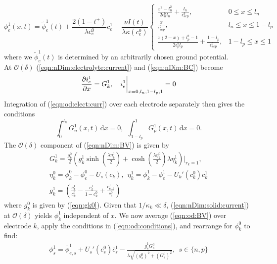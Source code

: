 \documentclass[preprint]{elsarticle}
\begin{document}
\begin{equation} 
	\phi_e^1(x,t) =\tilde{\phi}_e^1(t) + \frac{2(1-t^+)}{\lambda c_e^0}c_e^1 - \frac{\nu I(t)}{\lambda \kappa(c_e^0)}
    \begin{cases} 
    	   \frac{x^2-l_n^2}{2 \epsilon_n^b l_n} + \frac{l_n}{\epsilon_{sep}^b}, & 0\leq x \leq l_n \\
    	   \frac{x}{\epsilon_{sep}^b}, & l_n\leq x \leq 1-l_p \\
    	   \frac{x(2-x)+l_p^2-1}{2\epsilon_p^b l_p} + \frac{1-l_p}{\epsilon_{sep}^b}, & 1-l_p\leq x \leq 1
    \end{cases}  
\end{equation} 
where we $\tilde{\phi}_e^1(t)$ is determined by an arbitrarily chosen ground potential. \\

At $\mathcal{O}(\delta)$ (\ref{eqn:nDim:electrolyte:current}) and (\ref{eqn:nDim:BC}) become
\begin{align}\label{eqn:od:elect:curr}
	\pdv{i_e^1}{x} = G_k^1, \quad i_e^1\bigg|_{x=0,l_n,1-l_p,1} = 0 
\end{align} 
Integration of (\ref{eqn:od:elect:curr}) over each electrode separately then gives the conditions
\begin{equation}\label{eqn:od:conditions} 
	\int_0^{l_n} G_n^1(x,t)\, \text{d}x = 0, \ \ \int_{1-l_p}^1 G_p^1(x,t)\, \text{d}x = 0. 
\end{equation}
The $\mathcal{O}(\delta)$ component of (\ref{eqn:nDim:BV}) is given by
    \begin{gather} \label{eqn:od:BV}
    	G_k^1 = \frac{g_k^0}{2} \left( g_k^1 \sinh\left( \frac{\lambda\eta_k^0}{2}  \right) + \cosh(\frac{\lambda\eta_k^0}{2} ) \lambda \eta_k^1 \right)\bigg|_{r_k=1}, \\ \eta_k^0 = \phi^0_k - \phi^0_e - U_s(c_k), \ \ \eta_k^1 = \phi^1_k - \phi^1_e - U_k'(c^0_k)c_k^1\\
    g_k^1 = \left(\frac{c_k^1}{c_k^0} - \frac{c_k^1}{1-c_k^0} + \frac{c_{e,k}^1}{c_e^0} \right) 
    \end{gather} 
where $g_k^0$ is given by (\ref{eqn:gk0}). Given that $1/\kappa_k\ll\delta$, (\ref{eqn:nDim:solid:current}) at $\mathcal{O}(\delta)$ yields $\phi_k^1$ independent of $x$. We now average (\ref{eqn:od:BV}) over electrode $k$, apply the conditions in (\ref{eqn:od:conditions}), and rearrange for $\phi_k^0$ to find:
\begin{gather}\label{eqn:od:BV_av}
	\phi_s^1 = \bar{\phi}_{e,s}^1 + U_s'(c_s^0)\bar{c}_s^1 - \frac{\bar{g}_s^1G_s^0}{\lambda\sqrt{(g_s^0)^2 + (G_s^0)^2}}, \ \ s\in\{n,p\}
\end{gather} 
\end{document}
